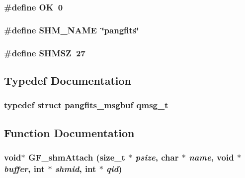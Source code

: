 \subsubsection{\setlength{\rightskip}{0pt plus 5cm}\#define OK~0}\label{GF__shmem_8h_ba51915c87d64af47fb1cc59348961c9}


\subsubsection{\setlength{\rightskip}{0pt plus 5cm}\#define SHM\_\-NAME~\char`\"{}pangfits\char`\"{}}\label{GF__shmem_8h_86393b21e6f74e9870d92149e7fe7f20}


\subsubsection{\setlength{\rightskip}{0pt plus 5cm}\#define SHMSZ~27}\label{GF__shmem_8h_f328b6ce3cae231d90cfbf2f340d03c2}




\subsection{Typedef Documentation}
\subsubsection{\setlength{\rightskip}{0pt plus 5cm}typedef struct \bf{pangfits\_\-msgbuf}  \bf{qmsg\_\-t}}\label{GF__shmem_8h_6658236f1c5f7deef7c45cc6b55a27c1}




\subsection{Function Documentation}
\subsubsection{\setlength{\rightskip}{0pt plus 5cm}void$\ast$ GF\_\-shm\-Attach (size\_\-t $\ast$ {\em psize}, char $\ast$ {\em name}, void $\ast$ {\em buffer}, int $\ast$ {\em shmid}, int $\ast$ {\em qid})}\label{GF__shmem_8h_a37edee6aebb1f0e00ea391a47b51456}


